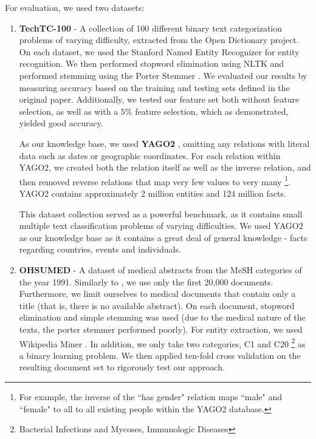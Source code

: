 \documentclass[twoside,11pt]{article}
\theoremstyle{definition}
\begin{document}
For evaluation, we used two datasets:
\begin{enumerate}
	\item \textbf{TechTC-100} \cite{gabrilovich2004text} - A collection of 100 different binary text categorization problems of varying difficulty, extracted from the Open Dictionary project. On each dataset, we used the Stanford Named Entity Recognizer \cite{finkel2005incorporatingfull} for entity recognition. We then performed stopword elimination using NLTK \cite{bird2009natural} and performed stemming using the Porter Stemmer \cite{van1980new}.
	We evaluated our results by measuring accuracy based on the training and testing sets defined in the original paper. Additionally, we tested our feature set both without feature selection, as well as with a $5\%$ feature selection, which as  demonstrated, yielded good accuracy.
	
	As our knowledge base, we used \textbf{YAGO2} \cite{hoffart2013yago2}, omitting any relations with literal data such as dates or geographic coordinates. For each relation within YAGO2, we created both the relation itself as well as the inverse relation, and then removed reverse relations that map very few values to very many \footnote{For example, the inverse of the ``has gender" relation  maps ``male" and ``female" to all to all existing people within the YAGO2 database.}. YAGO2 contains approximately 2 million entities and 124 million facts.
	
	This dataset collection served as a powerful benchmark, as it contains small multiple text classification problems of varying difficulties. We used YAGO2 as our knowledge base as it contains a great deal of general knowledge - facts regarding countries, events and individuals.
	\item \textbf{OHSUMED} \cite{hersh1994ohsumed} - A dataset of medical abstracts from the MeSH categories of the year 1991. Similarly to , we use only the first 20,000 documents. Furthermore, we limit ourselves to medical documents that contain only a title (that is, there is no available abstract). On each document, stopword elimination and simple stemming was used (due to the medical nature of the texts, the porter stemmer performed poorly). For entity extraction, we used Wikipedia Miner \cite{milne2013open}.  In addition, we only take two categories, C1 and C20 \footnote{Bacterial Infections and Mycoses, Immunologic Diseases} as a binary learning problem. We then applied ten-fold cross validation on the resulting document set to rigorously test  our approach.
	

\end{enumerate}
\end{document}
